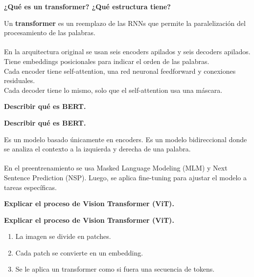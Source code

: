 \documentclass[10pt]{memoir}
\begin{document}
\clearpage
\begin{center}
	\textbf{\Large ¿Qué es un transformer? ¿Qué estructura tiene?}
\end{center}
\noindent Un \textbf{transformer} es un reemplazo de las RNNs que permite la paralelización del procesamiento de las palabras. \\
\\
\noindent En la arquitectura original se usan seis encoders apilados y seis decoders apilados. Tiene embeddings posicionales para indicar el orden de las palabras. \\
Cada encoder tiene self-attention, una red neuronal feedforward y conexiones residuales. \\
Cada decoder tiene lo mismo, solo que el self-attention usa una máscara.

\clearpage
\begin{center}
	\textbf{\Large Describir qué es BERT.}
\end{center}

\clearpage
\begin{center}
	\textbf{\Large Describir qué es BERT.}
\end{center}
\noindent Es un modelo basado únicamente en encoders. Es un modelo bidireccional donde se analiza el contexto a la izquierda y derecha de una palabra. \\
\\
\noindent En el preentrenamiento se usa Masked Language Modeling (MLM) y Next Sentence Prediction (NSP). Luego, se aplica fine-tuning para ajustar el modelo a tareas específicas.

\clearpage
\begin{center}
	\textbf{\Large Explicar el proceso de Vision Transformer (ViT).}
\end{center}

\clearpage
\begin{center}
	\textbf{\Large Explicar el proceso de Vision Transformer (ViT).}
\end{center}
\begin{enumerate}
	\item La imagen se divide en patches.
	\item Cada patch se convierte en un embedding.
	\item Se le aplica un transformer como si fuera una secuencia de tokens.
\end{enumerate}
\end{document}
